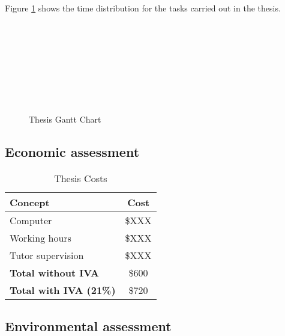 \documentclass[a4paper,11pt, titlepage, twoside]{article}
\begin{document}
Figure \ref{fig:gantt} shows the time distribution for the tasks carried out in the thesis.
\begin{figure}[h]
\begin{center}
\begin{ganttchart}{1}{20}
     \\
         \\
     \\
     \\
     \\
     \\
     \\
\end{ganttchart}
\caption{Thesis Gantt Chart}
\label{fig:gantt}
\end{center}
\end{figure}

\subsection{Economic assessment}

\begin{table}[h]
\centering
\begin{tabular}{l|c}
\hline
\textbf{Concept} & \textbf{Cost} \\
\hline
Computer & \$XXX \\
Working hours & \$XXX \\
Tutor supervision & \$XXX \\
\hline
\textbf{Total without IVA} & \$600 \\
\hline
\textbf{Total with IVA (21\%)} & \$720 \\
\hline
\end{tabular}
\caption{Thesis Costs}
\label{tab:costs}
\end{table}

\subsection{Environmental assessment}
\end{document}
